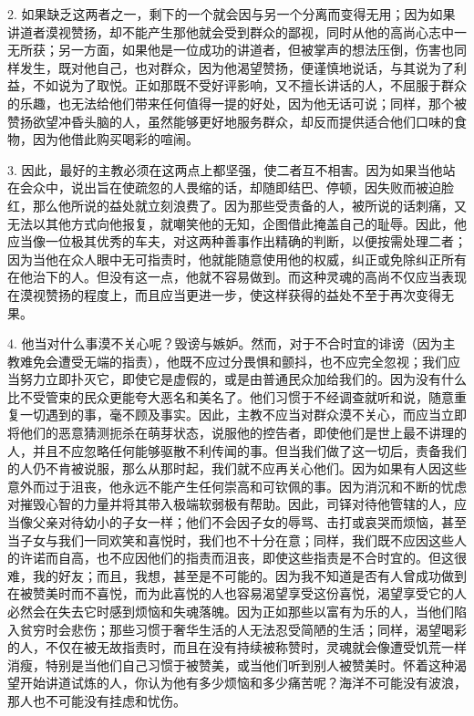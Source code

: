 2. 如果缺乏这两者之一，剩下的一个就会因与另一个分离而变得无用；因为如果讲道者漠视赞扬，却不能产生那他就会受到群众的鄙视，同时从他的高尚心志中一无所获；另一方面，如果他是一位成功的讲道者，但被掌声的想法压倒，伤害也同样发生，既对他自己，也对群众，因为他渴望赞扬，便谨慎地说话，与其说为了利益，不如说为了取悦。正如那既不受好评影响，又不擅长讲话的人，不屈服于群众的乐趣，也无法给他们带来任何值得一提的好处，因为他无话可说；同样，那个被赞扬欲望冲昏头脑的人，虽然能够更好地服务群众，却反而提供适合他们口味的食物，因为他借此购买喝彩的喧闹。\par

3. 因此，最好的主教必须在这两点上都坚强，使二者互不相害。因为如果当他站在会众中，说出旨在使疏忽的人畏缩的话，却随即结巴、停顿，因失败而被迫脸红，那么他所说的益处就立刻浪费了。因为那些受责备的人，被所说的话刺痛，又无法以其他方式向他报复，就嘲笑他的无知，企图借此掩盖自己的耻辱。因此，他应当像一位极其优秀的车夫，对这两种善事作出精确的判断，以便按需处理二者；因为当他在众人眼中无可指责时，他就能随意使用他的权威，纠正或免除纠正所有在他治下的人。但没有这一点，他就不容易做到。而这种灵魂的高尚不仅应当表现在漠视赞扬的程度上，而且应当更进一步，使这样获得的益处不至于再次变得无果。\par

4. 他当对什么事漠不关心呢？毁谤与嫉妒。然而，对于不合时宜的诽谤（因为主教难免会遭受无端的指责），他既不应过分畏惧和颤抖，也不应完全忽视；我们应当努力立即扑灭它，即使它是虚假的，或是由普通民众加给我们的。因为没有什么比不受管束的民众更能夸大恶名和美名了。他们习惯于不经调查就听和说，随意重复一切遇到的事，毫不顾及事实。因此，主教不应当对群众漠不关心，而应当立即将他们的恶意猜测扼杀在萌芽状态，说服他的控告者，即使他们是世上最不讲理的人，并且不应忽略任何能够驱散不利传闻的事。但当我们做了这一切后，责备我们的人仍不肯被说服，那么从那时起，我们就不应再关心他们。因为如果有人因这些意外而过于沮丧，他永远不能产生任何崇高和可钦佩的事。因为消沉和不断的忧虑对摧毁心智的力量并将其带入极端软弱极有帮助。因此，司铎对待他管辖的人，应当像父亲对待幼小的子女一样；他们不会因子女的辱骂、击打或哀哭而烦恼，甚至当子女与我们一同欢笑和喜悦时，我们也不十分在意；同样，我们既不应因这些人的许诺而自高，也不应因他们的指责而沮丧，即使这些指责是不合时宜的。但这很难，我的好友；而且，我想，甚至是不可能的。因为我不知道是否有人曾成功做到在被赞美时而不喜悦，而为此喜悦的人也容易渴望享受这份喜悦，渴望享受它的人必然会在失去它时感到烦恼和失魂落魄。因为正如那些以富有为乐的人，当他们陷入贫穷时会悲伤；那些习惯于奢华生活的人无法忍受简陋的生活；同样，渴望喝彩的人，不仅在被无故指责时，而且在没有持续被称赞时，灵魂就会像遭受饥荒一样消瘦，特别是当他们自己习惯于被赞美，或当他们听到别人被赞美时。怀着这种渴望开始讲道试炼的人，你认为他有多少烦恼和多少痛苦呢？海洋不可能没有波浪，那人也不可能没有挂虑和忧伤。\par

